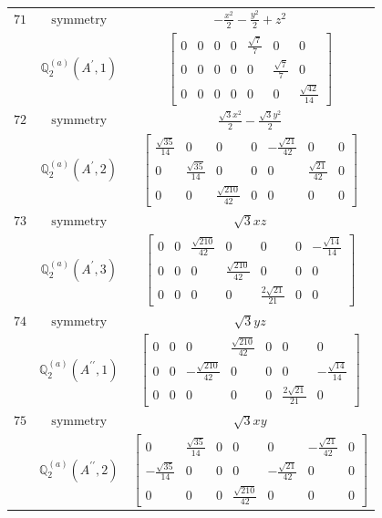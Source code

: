 \documentclass[fleqn,8pt,landscape]{jsarticle}
\begin{document}
\begin{longtable}{ccc}
$ 71 $ & $ \text{symmetry} $ & $ - \frac{x^{2}}{2} - \frac{y^{2}}{2} + z^{2} $ \\
$  $ & $ \mathbb{Q}_{2}^{(a)}(A^{\prime},1) $ & $ \begin{bmatrix} 0 & 0 & 0 & 0 & \frac{\sqrt{7}}{7} & 0 & 0 \\ 0 & 0 & 0 & 0 & 0 & \frac{\sqrt{7}}{7} & 0 \\ 0 & 0 & 0 & 0 & 0 & 0 & \frac{\sqrt{42}}{14} \end{bmatrix} $ \\ \hline
$ 72 $ & $ \text{symmetry} $ & $ \frac{\sqrt{3} x^{2}}{2} - \frac{\sqrt{3} y^{2}}{2} $ \\
$  $ & $ \mathbb{Q}_{2}^{(a)}(A^{\prime},2) $ & $ \begin{bmatrix} \frac{\sqrt{35}}{14} & 0 & 0 & 0 & - \frac{\sqrt{21}}{42} & 0 & 0 \\ 0 & \frac{\sqrt{35}}{14} & 0 & 0 & 0 & \frac{\sqrt{21}}{42} & 0 \\ 0 & 0 & \frac{\sqrt{210}}{42} & 0 & 0 & 0 & 0 \end{bmatrix} $ \\ \hline
$ 73 $ & $ \text{symmetry} $ & $ \sqrt{3} x z $ \\
$  $ & $ \mathbb{Q}_{2}^{(a)}(A^{\prime},3) $ & $ \begin{bmatrix} 0 & 0 & \frac{\sqrt{210}}{42} & 0 & 0 & 0 & - \frac{\sqrt{14}}{14} \\ 0 & 0 & 0 & \frac{\sqrt{210}}{42} & 0 & 0 & 0 \\ 0 & 0 & 0 & 0 & \frac{2 \sqrt{21}}{21} & 0 & 0 \end{bmatrix} $ \\ \hline
$ 74 $ & $ \text{symmetry} $ & $ \sqrt{3} y z $ \\
$  $ & $ \mathbb{Q}_{2}^{(a)}(A^{\prime\prime},1) $ & $ \begin{bmatrix} 0 & 0 & 0 & \frac{\sqrt{210}}{42} & 0 & 0 & 0 \\ 0 & 0 & - \frac{\sqrt{210}}{42} & 0 & 0 & 0 & - \frac{\sqrt{14}}{14} \\ 0 & 0 & 0 & 0 & 0 & \frac{2 \sqrt{21}}{21} & 0 \end{bmatrix} $ \\ \hline
$ 75 $ & $ \text{symmetry} $ & $ \sqrt{3} x y $ \\
$  $ & $ \mathbb{Q}_{2}^{(a)}(A^{\prime\prime},2) $ & $ \begin{bmatrix} 0 & \frac{\sqrt{35}}{14} & 0 & 0 & 0 & - \frac{\sqrt{21}}{42} & 0 \\ - \frac{\sqrt{35}}{14} & 0 & 0 & 0 & - \frac{\sqrt{21}}{42} & 0 & 0 \\ 0 & 0 & 0 & \frac{\sqrt{210}}{42} & 0 & 0 & 0 \end{bmatrix} $ \\ \hline

\end{longtable}
\end{document}
